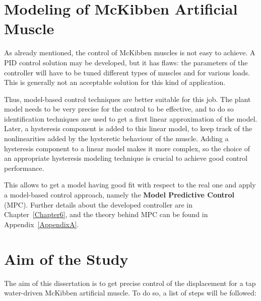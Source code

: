 \section{Modeling of McKibben Artificial Muscle}

As already mentioned, the control of McKibben muscles is not easy to achieve.
A PID control solution may be developed, but it has flaws:
the parameters of the controller will have to be tuned different types of muscles
and for various loads. 
This is generally not an acceptable solution for this kind of application.

Thus, model-based control techniques are better suitable for this job. The plant model
needs to be very precise for the control to be effective, and to do so identification techniques are used to get a first linear approximation of the model.
Later, a hysteresis component is added to this linear model, to keep track of the
nonlinearities added by the hysteretic behaviour of the muscle.
Adding a hysteresis component to a linear model makes it more complex, 
so the choice of an appropriate hysteresis modeling technique is crucial to achieve
good control performance.

This allows to get a model having good fit with respect to the real one
and apply a model-based control approach, namely the \textbf{Model Predictive Control} (MPC).
Further details about the developed controller are in Chapter~\ref{Chapter6},
and the theory behind MPC can be found in Appendix~\ref{AppendixA}.

\section{Aim of the Study}

The aim of this dissertation is to get precise control of the displacement for
a tap water-driven McKibben artificial muscle. To do so, a list of steps will be followed:


